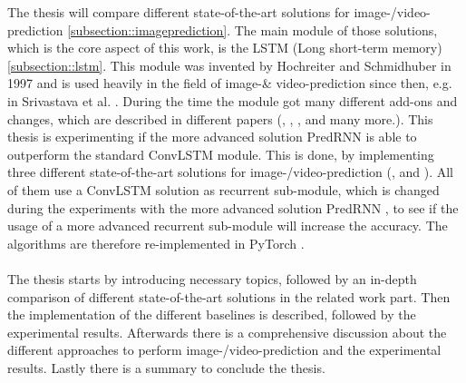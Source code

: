 The thesis will compare different state-of-the-art solutions for image-/video-prediction \ref{subsection::imageprediction}.
The main module of those solutions, which is the core aspect of this work, is the LSTM (Long short-term memory) \ref{subsection::lstm}.
This module was invented by Hochreiter and Schmidhuber  \cite{Hochreiter1997} in 1997 and is used heavily in the field of image-\& video-prediction since then, e.g. in Srivastava et al. 
\cite{Srivastava2015}.
During the time the module got many different add-ons and changes, which are described in different papers (\cite{Patraucean2015}, \cite{Lotter2016}, \cite{Wang2017}, \cite{Wang2018} and many 
more.). 
This thesis is experimenting if the more advanced solution PredRNN \cite{Wang2017} is able to outperform the standard ConvLSTM module. This is done, by implementing
three different state-of-the-art solutions for image-/video-prediction (\cite{Shi2015}, \cite{Patraucean2015} and \cite{Lotter2016}).
All of them use a ConvLSTM solution as recurrent sub-module, which is changed during the experiments
with the more advanced solution PredRNN \cite{Wang2017}, to see if the usage of a more advanced recurrent sub-module will increase the accuracy. The algorithms are therefore re-implemented in PyTorch \cite{Paszke2019}.\\\\
The thesis starts by introducing necessary topics, followed by an in-depth comparison of different state-of-the-art solutions in the related work part. Then the implementation of the different baselines is described, followed by the experimental results. Afterwards there is a comprehensive discussion about the different
approaches to perform image-/video-prediction and the experimental results. Lastly there is a summary to conclude the thesis.